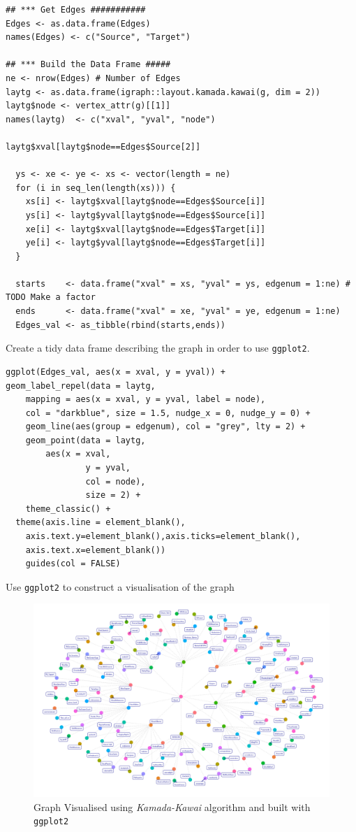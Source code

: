 \documentclass[11pt]{article}
\begin{document}
\begin{listing}[htbp]
\begin{verbatim}
## *** Get Edges ###########
Edges <- as.data.frame(Edges)
names(Edges) <- c("Source", "Target")

## *** Build the Data Frame #####
ne <- nrow(Edges) # Number of Edges
laytg <- as.data.frame(igraph::layout.kamada.kawai(g, dim = 2))
laytg$node <- vertex_attr(g)[[1]]
names(laytg)  <- c("xval", "yval", "node")

laytg$xval[laytg$node==Edges$Source[2]]

  ys <- xe <- ye <- xs <- vector(length = ne)
  for (i in seq_len(length(xs))) {
    xs[i] <- laytg$xval[laytg$node==Edges$Source[i]]
    ys[i] <- laytg$yval[laytg$node==Edges$Source[i]]
    xe[i] <- laytg$xval[laytg$node==Edges$Target[i]]
    ye[i] <- laytg$yval[laytg$node==Edges$Target[i]]
  }

  starts    <- data.frame("xval" = xs, "yval" = ys, edgenum = 1:ne) # TODO Make a factor
  ends      <- data.frame("xval" = xe, "yval" = ye, edgenum = 1:ne)
  Edges_val <- as_tibble(rbind(starts,ends))
\end{verbatim}
\caption{\label{org574f91a}Create a tidy data frame describing the graph in order to use \texttt{ggplot2}.}
\end{listing}

\begin{listing}[htbp]
\begin{verbatim}
ggplot(Edges_val, aes(x = xval, y = yval)) +
geom_label_repel(data = laytg,
    mapping = aes(x = xval, y = yval, label = node),
    col = "darkblue", size = 1.5, nudge_x = 0, nudge_y = 0) +
    geom_line(aes(group = edgenum), col = "grey", lty = 2) +
    geom_point(data = laytg,
        aes(x = xval,
                y = yval,
                col = node),
                size = 2) +
    theme_classic() +
  theme(axis.line = element_blank(),
    axis.text.y=element_blank(),axis.ticks=element_blank(),
    axis.text.x=element_blank())
    guides(col = FALSE)
\end{verbatim}
\caption{\label{orgb36c9f3}Use \texttt{ggplot2} to construct a visualisation of the graph}
\end{listing}

\begin{figure}[htbp]
\centering
\includegraphics[width=12cm]{./Figures/ggGraph.png}
\caption{\label{fig:org1bee07d}Graph Visualised using \emph{Kamada-Kawai} algorithm and built with \texttt{ggplot2}}
\end{figure}
\end{document}
